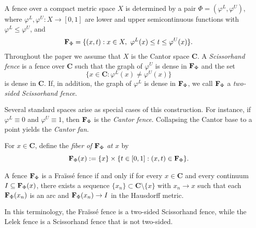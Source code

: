\documentclass[11pt]{amsart}
\newcommand{\cantor}{\mathbf C}
\newcommand{\fence}{{\bf F}_{\Phi}{}}
\begin{document}
\begin{figure}
    \label{fig:Fraisse}
\end{figure}

A fence over a compact metric space $X$ is determined by a pair $\Phi=(\varphi^L,\varphi^U)$, where $\varphi^L,\varphi^U:X\to[0,1]$ are lower and upper semicontinuous functions with $\varphi^L\leq\varphi^U$, and
\[
\fence=\{(x,t):x\in X,\ \varphi^L(x)\le t\le \varphi^U(x)\}.
\]
Throughout the paper we assume that $X$ is the Cantor space $\cantor$. A \emph{Scissorhand fence} is a fence over $\cantor$ such that the graph of $\varphi^U$ is dense in $\fence$ and the set
\[
\{x\in\cantor:\varphi^L(x)\neq\varphi^U(x)\}
\]
is dense in $\cantor$. If, in addition, the graph of $\varphi^L$ is dense in $\fence$, we call $\fence$ a \emph{two-sided Scissorhand fence}.

Several standard spaces arise as special cases of this construction. For instance, if $\varphi^L\equiv 0$ and $\varphi^U\equiv 1$, then $\fence$ is the \emph{Cantor fence}. Collapsing the Cantor base to a point yields the \emph{Cantor fan}.

For $x\in\cantor$, define the \emph{fiber of $\fence$ at $x$} by
\[
\fence(x):=\{x\}\times\{t\in[0,1]:(x,t)\in\fence\}.
\]

A fence $\fence$ is a Fra\"iss\'e fence if and only if for every $x\in\cantor$ and every continuum $I\subseteq \fence(x)$, there exists a sequence $\{x_n\}\subset \cantor\setminus\{x\}$ with $x_n\to x$ such that each $\fence(x_n)$ is an arc and $\fence(x_n)\to I$ in the Hausdorff metric.

In this terminology, the Fra\"iss\'e fence is a two-sided Scissorhand fence, while the Lelek fence is a Scissorhand fence that is not two-sided.
\end{document}
